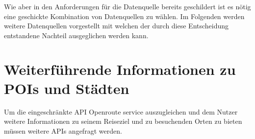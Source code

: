 \vspace{0.25cm}

Wie aber in den Anforderungen für die Datenquelle bereits geschildert ist es nötig eine geschickte Kombination von Datenquellen zu wählen. Im Folgenden werden weitere Datenquellen vorgestellt mit welchen der durch diese Entscheidung entstandene Nachteil ausgeglichen werden kann. 

\begin{table}[ht!]
	\centering
	\caption{Gegenüberstellung der vorliegenden Alternativen zur Abfrage der \acs{POI}s}
	\label{table:Entscheidungsmatrix}
\end{table}

\section{Weiterführende Informationen zu POIs und Städten}
Um die eingeschränkte API Openroute service auszugleichen und dem Nutzer weitere Informationen zu seinem Reiseziel und zu besuchenden Orten zu bieten müssen weitere APIs angefragt werden.

